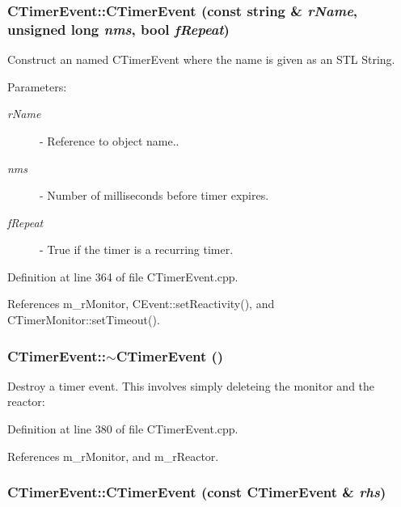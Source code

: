 \subsubsection{\setlength{\rightskip}{0pt plus 5cm}CTimer\-Event::CTimer\-Event (const string \& {\em r\-Name}, unsigned long {\em nms}, bool {\em f\-Repeat})}\label{classCTimerEvent_a2}


Construct an named CTimer\-Event where the name is given as an STL String. \begin{Desc}
\item[Parameters: ]\par
\begin{description}
\item[{\em 
r\-Name}]- Reference to object name..  \item[{\em 
nms}]- Number of milliseconds before timer expires. \item[{\em 
f\-Repeat}]- True if the timer is a recurring timer. \end{description}
\end{Desc}


Definition at line 364 of file CTimer\-Event.cpp.

References m\_\-r\-Monitor, CEvent::set\-Reactivity(), and CTimer\-Monitor::set\-Timeout().
\subsubsection{\setlength{\rightskip}{0pt plus 5cm}CTimer\-Event::$\sim$CTimer\-Event ()\hspace{0.3cm}{\tt  [virtual]}}\label{classCTimerEvent_a3}


Destroy a timer event. This involves simply deleteing the monitor and the reactor: 

Definition at line 380 of file CTimer\-Event.cpp.

References m\_\-r\-Monitor, and m\_\-r\-Reactor.
\subsubsection{\setlength{\rightskip}{0pt plus 5cm}CTimer\-Event::CTimer\-Event (const CTimer\-Event \& {\em rhs})\hspace{0.3cm}{\tt  [private]}}\label{classCTimerEvent_c0}




